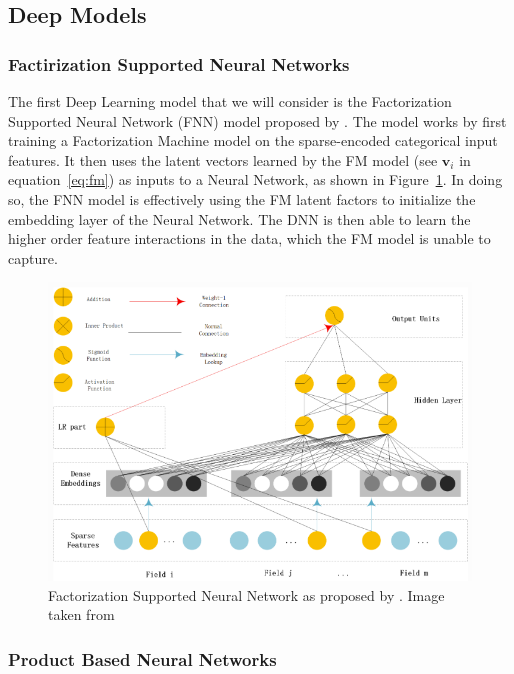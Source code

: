 \documentclass{mldsmsc}
\begin{document}
\subsection{Deep Models}

\subsubsection{Factirization Supported Neural Networks}

The first Deep Learning model that we will consider is the Factorization Supported
Neural Network (FNN) model proposed by \cite{RefWorks:zhang2016deep}. The model works by first training a Factorization Machine
model on the sparse-encoded categorical input features. It then uses the latent vectors learned by the FM model (see $\mathbf{v}_i$ in equation~\ref{eq:fm})
as inputs to a Neural Network, as shown in Figure~\ref{fig:fnn}. In doing so, the FNN model is effectively using the FM latent factors to initialize the embedding layer of the Neural Network.
The DNN is then able to learn the higher order feature interactions in the data, which the FM model is unable to capture.

\begin{figure}[h]
\centering
\includegraphics[]{../figures/fnn.png}
\caption{Factorization Supported Neural Network as proposed by \cite{RefWorks:zhang2016deep}. Image taken from \cite{RefWorks:shen2017deepctr:}}
\label{fig:fnn}
\end{figure}

\subsubsection{Product Based Neural Networks}
\end{document}
